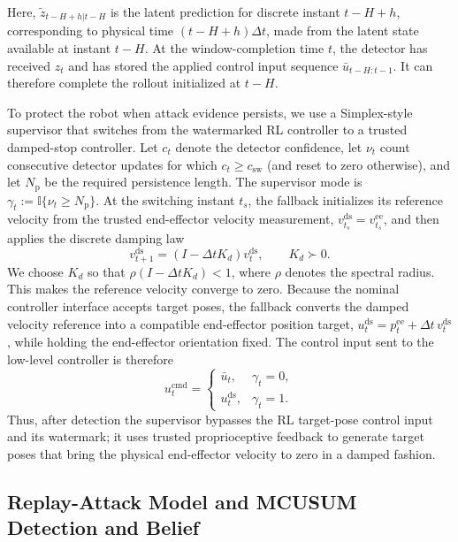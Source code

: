 \documentclass[letterpaper, 10 pt, conference]{ieeeconf}
\theoremstyle{plain}
\begin{document}
Here, $\tilde z_{t-H+h|t-H}$ is the latent prediction for discrete instant $t-H+h$, corresponding to physical time $(t-H+h)\Delta t$, made from the latent state available at instant $t-H$.
At the window-completion time \(t\), the detector has received \(z_t\) and has stored the applied control input sequence \(\bar{u}_{t-H:t-1}\). It can therefore complete the rollout initialized at \(t-H\).

To protect the robot when attack evidence persists, we use a Simplex-style supervisor that switches from the watermarked RL controller to a trusted damped-stop controller. Let $c_t$ denote the detector confidence, let $\nu_t$ count consecutive detector updates for which $c_t\ge c_{\mathrm{sw}}$ (and reset to zero otherwise), and let $N_{\mathrm{p}}$ be the required persistence length. The supervisor mode is $\gamma_t:=\mathbb{I}\{\nu_t\ge N_{\mathrm{p}}\}$. At the switching instant $t_s$, the fallback initializes its reference velocity from the trusted end-effector velocity measurement, $v_{t_s}^{\mathrm{ds}}=v_{t_s}^{\mathrm{ee}}$, and then applies the discrete damping law
\begin{equation}\label{eq:damped_stop_velocity}
    v_{t+1}^{\mathrm{ds}}
    =
    \left(I-\Delta t K_d\right)v_t^{\mathrm{ds}},
    \qquad K_d\succ0.
\end{equation}
We choose $K_d$ so that $\rho(I-\Delta t K_d)<1$, where $\rho$ denotes the spectral radius. This makes the reference velocity converge to zero. Because the nominal controller interface accepts target poses, the fallback converts the damped velocity reference into a compatible end-effector position target,
$u_t^{\mathrm{ds}}=p_t^{\mathrm{ee}}+\Delta t\,v_t^{\mathrm{ds}}$, while holding the end-effector orientation fixed. The control input sent to the low-level controller is therefore
\begin{equation}\label{eq:supervisory_command}
    u_t^{\mathrm{cmd}} =
    \begin{cases}
        \bar u_t, & \gamma_t=0,\\
        u_t^{\mathrm{ds}}, & \gamma_t=1.
    \end{cases}
\end{equation}
Thus, after detection the supervisor bypasses the RL target-pose control input and its watermark; it uses trusted proprioceptive feedback to generate target poses that bring the physical end-effector velocity to zero in a damped fashion.

\subsection{Replay-Attack Model and MCUSUM Detection and Belief}
\end{document}
